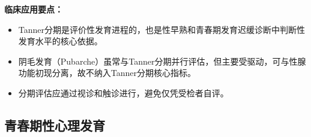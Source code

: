 \begin{keybox}
\vspace{3pt}
\begin{center}
\end{center}
\vspace{3pt}

\textbf{临床应用要点：}
\begin{itemize}[leftmargin=*]
    \item Tanner分期是评价性发育进程的，也是性早熟和青春期发育迟缓诊断中判断性发育水平的核心依据。
    \item 阴毛发育（Pubarche）虽常与Tanner分期并行评估，但主要受驱动，可与性腺功能初现分离，故不纳入Tanner分期核心指标。
    \item 分期评估应通过视诊和触诊进行，避免仅凭受检者自评。
\end{itemize}
\end{keybox}

\subsection{青春期性心理发育}

